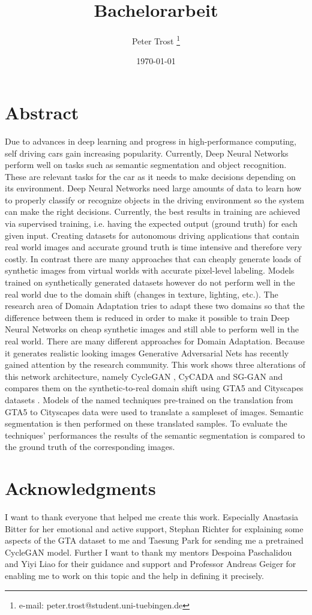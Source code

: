 \documentclass[a4paper,cleardoubleempty,BCOR1cm]{scrbook}
\title{Bachelorarbeit}
\author{Peter Trost \thanks{e-mail: peter.trost@student.uni-tuebingen.de}}
\date{\today}
\begin{document}


\chapter*{Abstract}
Due to advances in deep learning and progress in high-performance computing, self driving cars gain increasing popularity. Currently, Deep Neural Networks perform well on tasks such as semantic segmentation and object recognition. These are relevant tasks for the car as it needs to make decisions depending on its environment. Deep Neural Networks need large amounts of data to learn how to properly classify or recognize objects in the driving environment so the system can make the right decisions. Currently, the best results in training are achieved via supervised training, i.e. having the expected output (ground truth) for each given input. Creating datasets for autonomous driving applications that contain real world images and accurate ground truth is time intensive and therefore very costly. In contrast there are many approaches that can cheaply generate loads of synthetic images from virtual worlds with accurate pixel-level labeling. Models trained on synthetically generated datasets however do not perform well in the real world due to the domain shift (changes in texture, lighting, etc.). The research area of Domain Adaptation tries to adapt these two domains so that the difference between them is reduced in order to make it possible to train Deep Neural Networks on cheap synthetic images and still able to perform well in the real world. There are many different approaches for Domain Adaptation. Because it generates realistic looking images Generative Adversarial Nets \cite{NIPS2014_5423} has recently gained attention by the research community. This work shows three alterations of this network architecture, namely CycleGAN \cite{DBLP:journals/corr/ZhuPIE17}, CyCADA \cite{DBLP:journals/corr/abs-1711-03213} and SG-GAN \cite{DBLP:journals/corr/abs-1801-01726} and compares them on the synthetic-to-real domain shift using GTA5 \cite{Richter_2016_ECCV} and Cityscapes datasets \cite{Cordts_2016_CVPR}. Models of the named techniques pre-trained on the translation from GTA5 to Cityscapes data were used to translate a sampleset of images. Semantic segmentation is then performed on these translated samples. To evaluate the techniques' performances the results of the semantic segmentation is compared to the ground truth of the corresponding images.


\chapter*{Acknowledgments}
I want to thank everyone that helped me create this work. Especially Anastasia Bitter for her emotional and active support, Stephan Richter for explaining some aspects of the GTA dataset to me and Taesung Park for sending me a pretrained CycleGAN model. Further I want to thank my mentors Despoina Paschalidou and Yiyi Liao for their guidance and support and Professor Andreas Geiger for enabling me to work on this topic and the help in defining it precisely.
\end{document}
